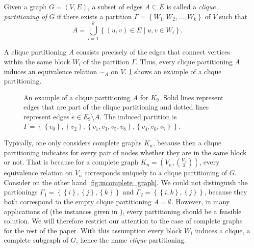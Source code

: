 \begin{definition}[\CP]\label{def:cp}
	Given a graph $G=(V,E)$, a subset of edges $A \subseteq E$ is called a \textit{clique partitioning of $G$} if there exists a partition $\Gamma = \left\{ W_1, W_2, \ldots, W_k \right\}$ of $V$ such that
	\[
		A = \bigcup_{i=1}^k \left\{ (u,v) \in E \mid u,v \in W_i \right\}.
	\]
\end{definition}
A clique partitioning $A$ consists precisely of the edges that connect vertices within the same block $W_i$ of the partition $\Gamma$.
Thus, every clique partitioning $A$ induces an equivalence relation $\sim_A$ on $V$.
\cref{fig:example_clique_partitioning} shows an example of a clique partitioning.

\begin{figure}[H]
	\centering
	\caption[Example clique partitioning]{An example of a clique partitioning $A$ for $K_{9}$. 
		Solid lines represent edges that are part of the clique partitioning and dotted lines represent edges $e \in E_{9} \setminus A$.
	The induced partition is $\Gamma = \left\{ \left\{ v_{0} \right\}, \left\{ v_{2} \right\}, \left\{ v_{1}, v_{3}, v_{5}, v_{8} \right\}, \left\{ v_{4}, v_{6}, v_{7} \right\} \right\}$.}
	\label{fig:example_clique_partitioning}
\end{figure}

Typically, one only considers complete graphs $K_n$, because then a clique partitioning indicates for every pair of nodes whether they are in the same block or not.
That is because for a complete graph $K_{n} = (V_{n}, \binom{V_{n}}{2})$, every equivalence relation on $V_{n}$ corresponds uniquely to a clique partitioning of $G$.
Consider on the other hand \cref{fig:incomplete_graph}.
We could not distinguish the partionings $\Gamma_{1} = \left\{ \left\{ i \right\}, \left\{ j \right\}, \left\{ k \right\} \right\}$ and $\Gamma_{2} = \left\{ \left\{ i, k \right\}, \left\{ j \right\} \right\}$, because they both correspond to the empty clique partitioning $A = \emptyset$.
However, in many applications of \CP (\eg the instances given in \cite{grotschelCuttingPlaneAlgorithm1989}), every partitioning should be a feasible solution.
We will therefore restrict our attention to the case of complete graphs for the rest of the paper.
With this assumption every block $W_i$ induces a clique, \ie a complete subgraph of $G$, hence the name \textit{clique} partitioning.

